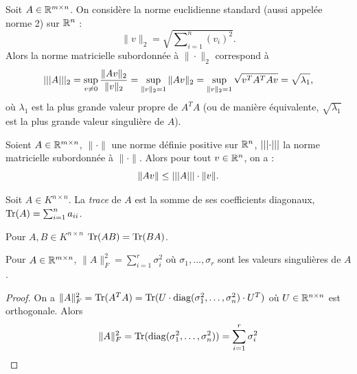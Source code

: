 \begin{example}
	Soit $A \in \mathbb{R}^{m \times n}$. On considère la norme euclidienne standard (aussi appelée norme 2) sur $\Bbb R^n$ : 
	$$\| v \|_2 = \sqrt{\sum\nolimits_{i=1}^n (v_i)^2}.$$
	Alors la norme matricielle subordonnée à $\|\cdot\|_2$ correspond à
	\begin{displaymath}
    	\lvert\lvert\lvert A\rvert\rvert\rvert_2 = \sup_{v \neq 0} \frac{\|Av\|_2}{\|v\|_2} = \sup_{\|v\|_2 = 1} \|Av\|_2 = \sup_{\|v\|_2 = 1} \sqrt{v^T A^T A v} = \sqrt{\lambda_1},
  	\end{displaymath}
  	où $\lambda_1$ est la plus grande valeur propre de $A^T A$ (ou de manière équivalente, $\sqrt{\lambda_1}$ est la plus grande valeur singulière de $A$).
\end{example}

\begin{exercise}
	Soient $A \in \mathbb{R}^{m \times n}$, $\|\cdot\|$ une norme définie positive sur $\Bbb R^n$, $\lvert\lvert\lvert\cdot\rvert\rvert\rvert$ la norme matricielle subordonnée à $\|\cdot\|$. Alors pour tout $v \in \Bbb R^n$, on a : 
	\begin{displaymath}
		\|Av\| \leq \lvert\lvert\lvert A\rvert\rvert\rvert \cdot \|v\|.
	\end{displaymath}
\end{exercise}

\begin{definition}
  \label{def:27}
  Soit $A \in K^{n \times n}$. La \emph{trace} de $A$ est la somme de ses coefficients diagonaux, $\operatorname{Tr}(A) = \sum_{i=1}^n a_{ii}$. 
\end{definition}

\begin{lemma}
  \label{lem:11}
  Pour $A,B \in K^{n \times n}$ $\operatorname{Tr}(AB) = \operatorname{Tr}(BA)$. 
\end{lemma}


\begin{lemma}
  \label{lem:10}
  Pour $A \in \mathbb{R}^{m \times n}$, $\|A\|_F^2 = \sum_{i=1}^r \sigma_i^2$ où $\sigma_1, \dots, \sigma_r$ sont les valeurs singulières de $A$. 
\end{lemma}

\begin{proof}
  On a $\|A\|_F^2 = \operatorname{Tr}(A^TA) = \operatorname{Tr}(U \cdot \operatorname{diag}(\sigma_1^2,\dots,\sigma_n^2) \cdot  U^T)$ où $U \in \mathbb{R}^{n \times n}$ est orthogonale. Alors 
  \begin{displaymath}
    \|A\|_F^2 = \operatorname{Tr}(\operatorname{diag}(\sigma_1^2,\dots,\sigma_n^2)) =  \sum_{i=1}^r \sigma_i^2
  \end{displaymath}
\end{proof}





